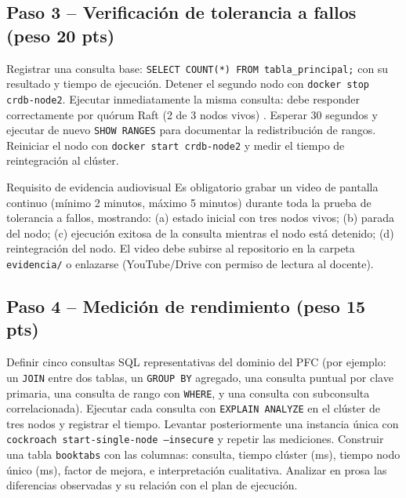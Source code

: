 \documentclass[11pt,a4paper]{article}
\begin{document}
\subsection*{Paso 3 -- Verificaci\'on de tolerancia a fallos (peso 20 pts)}

Registrar una consulta base: \texttt{SELECT COUNT(*) FROM tabla\_principal;} con su resultado y tiempo de ejecuci\'on. Detener el segundo nodo con \texttt{docker stop crdb-node2}. Ejecutar inmediatamente la misma consulta: debe responder correctamente por qu\'orum Raft (2 de 3 nodos vivos) \parencite{OngaroOusterhout2014Raft,Taft2020CockroachDB}. Esperar 30 segundos y ejecutar de nuevo \texttt{SHOW RANGES} para documentar la redistribuci\'on de rangos. Reiniciar el nodo con \texttt{docker start crdb-node2} y medir el tiempo de reintegraci\'on al cl\'uster.

\begin{uteqwarn}[width=\linewidth]{Requisito de evidencia audiovisual}
\small\justifying
Es obligatorio grabar un video de pantalla continuo (m\'inimo 2 minutos, m\'aximo 5 minutos) durante toda la prueba de tolerancia a fallos, mostrando: (a) estado inicial con tres nodos vivos; (b) parada del nodo; (c) ejecuci\'on exitosa de la consulta mientras el nodo est\'a detenido; (d) reintegraci\'on del nodo. El video debe subirse al repositorio en la carpeta \texttt{evidencia/} o enlazarse (YouTube/Drive con permiso de lectura al docente).
\end{uteqwarn}

\subsection*{Paso 4 -- Medici\'on de rendimiento (peso 15 pts)}

Definir cinco consultas SQL representativas del dominio del PFC (por ejemplo: un \texttt{JOIN} entre dos tablas, un \texttt{GROUP BY} agregado, una consulta puntual por clave primaria, una consulta de rango con \texttt{WHERE}, y una consulta con subconsulta correlacionada). Ejecutar cada consulta con \texttt{EXPLAIN ANALYZE} en el cl\'uster de tres nodos y registrar el tiempo. Levantar posteriormente una instancia \'unica con \texttt{cockroach start-single-node --insecure} y repetir las mediciones. Construir una tabla \texttt{booktabs} con las columnas: consulta, tiempo cl\'uster (ms), tiempo nodo \'unico (ms), factor de mejora, e interpretaci\'on cualitativa. Analizar en prosa las diferencias observadas y su relaci\'on con el plan de ejecuci\'on.
\end{document}
